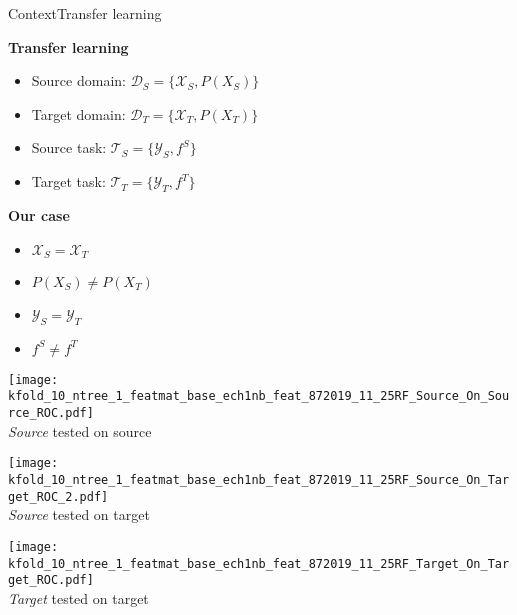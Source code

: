 \begin{frame}{Context}{Transfer learning}
\begin{minipage}[t]{0.49\linewidth}
    \vspace{0pt}
    \textbf{Transfer learning}
    \begin{itemize}
        \item Source domain: $\mathcal{D}_{S} = \{\mathcal{X}_{S}, P(X_{S})\}$\\
        \item Target domain: $\mathcal{D}_{T} = \{\mathcal{X}_{T}, P(X_{T})\}$\\
        \item Source task: $\mathcal{T}_{S} = \{\mathcal{Y}_{S}, f^S\}$\\
        \item Target task: $\mathcal{T}_{T} = \{\mathcal{Y}_{T}, f^T\}$\\
    \end{itemize}
\end{minipage}
\begin{minipage}[t]{0.49\linewidth}
    \vspace{0pt}
    \textbf{Our case}
    \begin{itemize}%
        \item $\mathcal{X}_{S} = \mathcal{X}_{T}$
        \item \textcolor{myorange}{$P(X_{S}) \neq P(X_{T})$}
        \item $\mathcal{Y}_{S} = \mathcal{Y}_{T}$
        \item \textcolor{myorange}{$f^S \neq f^T$}
    \end{itemize}
\end{minipage}

\bigskip

\renewcommand{\ratio}{0.32}
\begin{minipage}[t]{\linewidth}
    \centering
    \begin{minipage}[t]{\ratio\linewidth}
        \centering
        \texttt{[image: kfold\_10\_ntree\_1\_featmat\_base\_ech1nb\_feat\_872019\_11\_25RF\_Source\_On\_Source\_ROC.pdf]}\\
        {\small \emph{Source} tested on source}
    \end{minipage}
    \begin{minipage}[t]{\ratio\linewidth}
        \centering
        \texttt{[image: kfold\_10\_ntree\_1\_featmat\_base\_ech1nb\_feat\_872019\_11\_25RF\_Source\_On\_Target\_ROC\_2.pdf]}\\
        {\small \emph{Source} tested on target}
    \end{minipage}
    \begin{minipage}[t]{\ratio\linewidth}
        \centering
        \texttt{[image: kfold\_10\_ntree\_1\_featmat\_base\_ech1nb\_feat\_872019\_11\_25RF\_Target\_On\_Target\_ROC.pdf]}\\
        {\small \emph{Target} tested on target}
    \end{minipage}
\end{minipage}

\end{frame}

